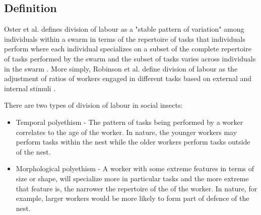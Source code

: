 \subsection{Definition}
\label{sec:second:definition}

Oster et al. defines division of labour as a "stable pattern of variation" among individuals within a swarm in terms of the repertoire of tasks that individuals perform where each individual specializes on a subset of the complete repertoire of tasks performed by the swarm and the subset of tasks varies across individuals in the swarm \cite{oster1978caste}.  
More simply, Robinson et al. define division of labour as the adjustment of ratios of workers engaged in different tasks based on external and internal stimuli \cite{robinson1992regulation}.

There are two types of division of labour in social insects: 
\begin{itemize}
	\item Temporal polyethism - The pattern of tasks being performed by a worker correlates to the age of the worker. In nature, the younger workers may perform tasks within the nest while the older workers perform tasks outside of the nest.
	\item Morphological polyethism - A worker with some extreme features in terms of size or shape, will specialize more in particular tasks and the more extreme that feature is, the narrower the repertoire of the of the worker. In nature, for example, larger workers would be more likely to form part of defence of the nest. \cite{beshers2001models}
\end{itemize}




